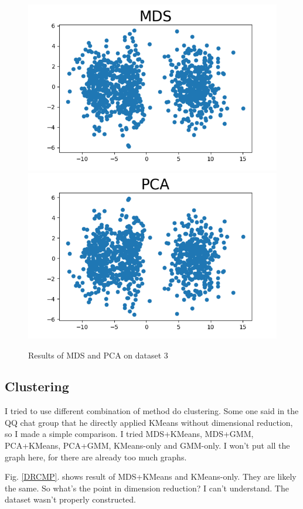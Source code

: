 \documentclass[conference]{IEEEtran}
\begin{document}
\begin{figure}[htbp]
	{\includegraphics[scale=0.28]{p3MDS.png}}
	{\includegraphics[scale=0.28]{p3PCA.png}}
	\caption{Results of MDS and PCA on dataset 3}
	\label{MDS_PCA1}
\end{figure}

\subsection{Clustering}
I tried to use different combination of method do clustering. Some one said in the QQ chat group that he directly applied KMeans without dimensional reduction, so I made a simple comparison. I tried MDS+KMeans, MDS+GMM, PCA+KMeans, PCA+GMM, KMeans-only and GMM-only. I won't put all the graph here, for there are already too much graphs.

Fig. \ref{DRCMP}. shows result of MDS+KMeans and KMeans-only. They are likely the same. So what's the point in dimension reduction? I can't understand. The dataset wasn't properly constructed.
\end{document}
